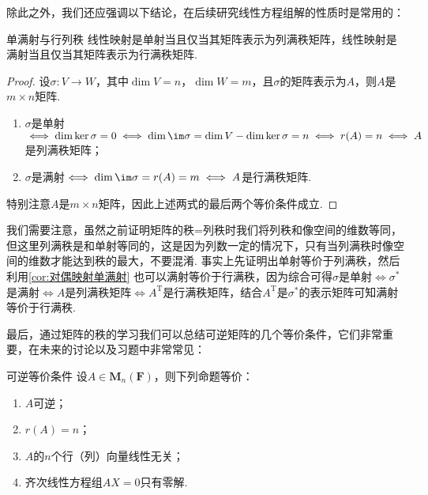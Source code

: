除此之外，我们还应强调以下结论，在后续研究线性方程组解的性质时是常用的：
\begin{theorem}{}{单满射与行列秩}
    线性映射是单射当且仅当其矩阵表示为列满秩矩阵，线性映射是满射当且仅当其矩阵表示为行满秩矩阵.
\end{theorem}

\begin{proof}
    设$\sigma:V\to W$，其中$\dim V=n$，$\dim W=m$，且$\sigma$的矩阵表示为$A$，则$A$是$m\times n$矩阵.
    \begin{enumerate}
        \item $\sigma$是单射$\iff\dim\ker\sigma=0\iff \dim\im\sigma=\dim V-\dim\ker\sigma=n\iff r(A)=n\iff A$是列满秩矩阵；

        \item $\sigma$是满射$\iff\dim\im\sigma=r(A)=m\iff A$是行满秩矩阵.
    \end{enumerate}
    特别注意$A$是$m\times n$矩阵，因此上述两式的最后两个等价条件成立.
\end{proof}

我们需要注意，虽然之前证明矩阵的秩=列秩时我们将列秩和像空间的维数等同，但这里列满秩是和单射等同的，这是因为列数一定的情况下，只有当列满秩时像空间的维数才能达到秩的最大，不要混淆. 事实上先证明出单射等价于列满秩，然后利用\autoref{cor:对偶映射单满射} 也可以满射等价于行满秩，因为综合可得$\sigma$是单射$\iff\sigma^*$是满射$\iff A$是列满秩矩阵$\iff A^\mathrm{T}$是行满秩矩阵，结合$A^\mathrm{T}$是$\sigma^*$的表示矩阵可知满射等价于行满秩.

最后，通过矩阵的秩的学习我们可以总结可逆矩阵的几个等价条件，它们非常重要，在未来的讨论以及习题中非常常见：
\begin{theorem}{}{可逆等价条件}
    设$A \in \mathbf{M}_n(\mathbf{F})$，则下列命题等价：
    \begin{enumerate}[label=(\arabic*)]
        \item \label{item:11:可逆等价条件:1}
              $A$可逆；

        \item \label{item:11:可逆等价条件:2}
              $r(A)=n$；

        \item \label{item:11:可逆等价条件:3}
              $A$的$n$个行（列）向量线性无关；

        \item \label{item:11:可逆等价条件:4}
              齐次线性方程组$AX=0$只有零解.
    \end{enumerate}
\end{theorem}

